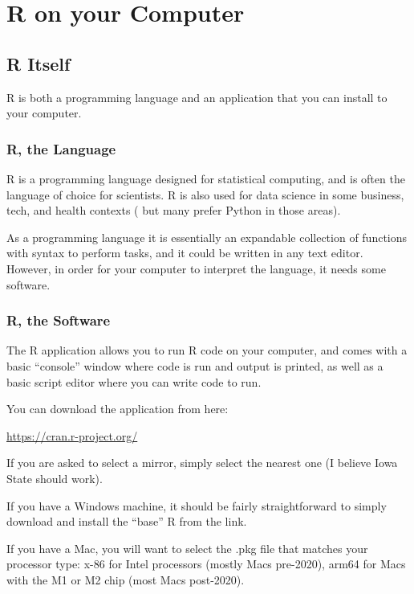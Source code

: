 \documentclass[
  letterpaper,
  DIV=11,
  numbers=noendperiod]{scrreprt}
\begin{document}
\part{R on your Computer}

\hypertarget{r-itself}{%
\chapter{R Itself}\label{r-itself}}

R is both a programming language and an application that you can install
to your computer.

\hypertarget{r-the-language}{%
\section{R, the Language}\label{r-the-language}}

R is a programming language designed for statistical computing, and is
often the language of choice for scientists. R is also used for data
science in some business, tech, and health contexts ( but many prefer
Python in those areas).

As a programming language it is essentially an expandable collection of
functions with syntax to perform tasks, and it could be written in any
text editor. However, in order for your computer to interpret the
language, it needs some software.

\hypertarget{r-the-software}{%
\section{R, the Software}\label{r-the-software}}

The R application allows you to run R code on your computer, and comes
with a basic ``console'' window where code is run and output is printed,
as well as a basic script editor where you can write code to run.

You can download the application from here:

\url{https://cran.r-project.org/}

If you are asked to select a mirror, simply select the nearest one (I
believe Iowa State should work).

If you have a Windows machine, it should be fairly straightforward to
simply download and install the ``base'' R from the link.

If you have a Mac, you will want to select the .pkg file that matches
your processor type: x-86 for Intel processors (mostly Macs pre-2020),
arm64 for Macs with the M1 or M2 chip (most Macs post-2020).
\end{document}

